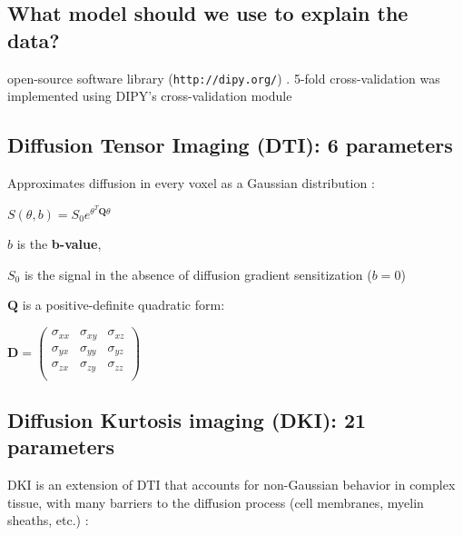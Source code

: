 \documentclass[a0, landscape]{a0poster}
\begin{document}
\begin{multicols}{3}
\subsection*{What model should we use to explain the data?}

open-source software library (\texttt{http://dipy.org/}) . 5-fold cross-validation was implemented using DIPY's cross-validation module \cite{Rokem2015PLoS}


\subsection*{Diffusion Tensor Imaging (DTI): 6 parameters}

Approximates diffusion in every voxel as a Gaussian distribution
\cite{Basser1994-hg}:

\vspace{2mm}
\begin{center}
\begin{large}

$S(\theta, b) = S_0 e^{\theta^T \mathbf{Q} \theta} $

\end{large}
\end{center}

\noindent $b$ is the \textbf {b-value},

\noindent $S_0$ is the signal in the absence of diffusion gradient sensitization ($b=0$)

\noindent $\mathbf{Q}$ is a positive-definite quadratic form:

\vspace{2mm}
\begin{center}

$\mathbf{D} = \begin{pmatrix} \sigma_{xx} & \sigma_{xy} & \sigma_{xz} \\
                              \sigma_{yx} & \sigma_{yy} & \sigma_{yz} \\
				                      \sigma_{zx} & \sigma_{zy} & \sigma_{zz} \\
\end{pmatrix} $

\end{center}

\subsection*{Diffusion Kurtosis imaging (DKI): 21 parameters}

DKI is an extension of DTI that accounts for non-Gaussian behavior in complex tissue, with many barriers to the diffusion process (cell membranes,
myelin sheaths, etc.) \cite{Jensen2005-vr}:


\end{multicols}
\end{document}
